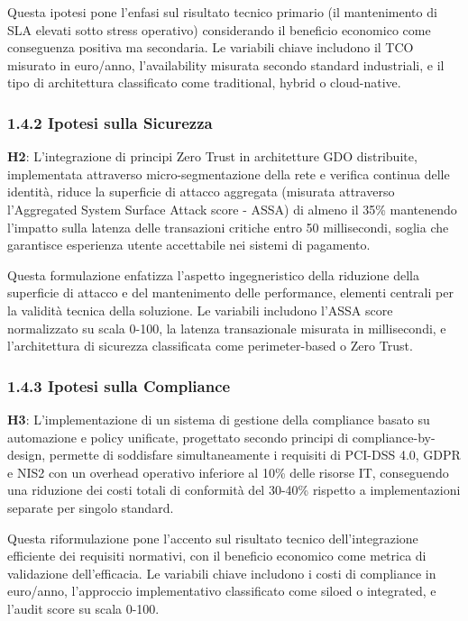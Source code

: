 \documentclass{report}
\begin{document}
Questa ipotesi pone l'enfasi sul risultato tecnico primario (il
mantenimento di SLA elevati sotto stress operativo) considerando il
beneficio economico come conseguenza positiva ma secondaria. Le
variabili chiave includono il TCO misurato in euro/anno, l'availability
misurata secondo standard industriali, e il tipo di architettura
classificato come traditional, hybrid o cloud-native.

\subsubsection{\texorpdfstring{\textbf{1.4.2 Ipotesi sulla
Sicurezza}}{1.4.2 Ipotesi sulla Sicurezza}}\label{ipotesi-sulla-sicurezza}

\textbf{H2}: L'integrazione di principi Zero Trust in architetture GDO
distribuite, implementata attraverso micro-segmentazione della rete e
verifica continua delle identità, riduce la superficie di attacco
aggregata (misurata attraverso l'Aggregated System Surface Attack score
- ASSA) di almeno il 35\% mantenendo l'impatto sulla latenza delle
transazioni critiche entro 50 millisecondi, soglia che garantisce
esperienza utente accettabile nei sistemi di pagamento.

Questa formulazione enfatizza l'aspetto ingegneristico della riduzione
della superficie di attacco e del mantenimento delle performance,
elementi centrali per la validità tecnica della soluzione. Le variabili
includono l'ASSA score normalizzato su scala 0-100, la latenza
transazionale misurata in millisecondi, e l'architettura di sicurezza
classificata come perimeter-based o Zero Trust.

\subsubsection{\texorpdfstring{\textbf{1.4.3 Ipotesi sulla
Compliance}}{1.4.3 Ipotesi sulla Compliance}}\label{ipotesi-sulla-compliance}

\textbf{H3}: L'implementazione di un sistema di gestione della
compliance basato su automazione e policy unificate, progettato secondo
principi di compliance-by-design, permette di soddisfare simultaneamente
i requisiti di PCI-DSS 4.0, GDPR e NIS2 con un overhead operativo
inferiore al 10\% delle risorse IT, conseguendo una riduzione dei costi
totali di conformità del 30-40\% rispetto a implementazioni separate per
singolo standard.

Questa riformulazione pone l'accento sul risultato tecnico
dell'integrazione efficiente dei requisiti normativi, con il beneficio
economico come metrica di validazione dell'efficacia. Le variabili
chiave includono i costi di compliance in euro/anno, l'approccio
implementativo classificato come siloed o integrated, e l'audit score su
scala 0-100.
\end{document}
